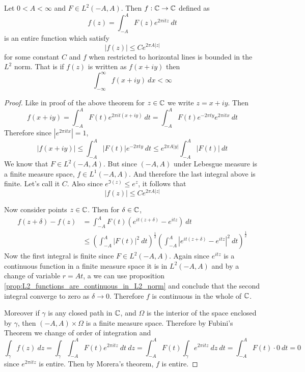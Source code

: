 \begin{proposition}
  Let $0<A<\infty$ and $F \in L^2(-A, A)$. Then $f:\mathbb C \to \mathbb C$ defined as $$f(z) = \int_{-A}^A F(z)e^{2\pi itz} \ dt$$
  is an entire function which satisfy $$|f(z)| \le Ce^{2 \pi A|z|}$$
  for some constant $C$ and $f$ when restricted to horizontal lines is bounded in the $L^2$ norm. That is if $f(z)$ is written as $f(x+iy)$ then  $$\int_{-\infty}^{\infty} f(x+iy) \ dx < \infty$$
\end{proposition}
\begin{proof}
  Like in proof of the above theorem for $z\in \mathbb C$ we write $z = x+iy$. Then $$f(x+iy) = \int_{-A}^A F(t) e^{2\pi it(x+iy)} \ dt = \int_{-A}^A F(t)e^{-2\pi ty}e^{2\pi itx} \ dt$$
  Therefore since $|e^{2\pi it x}| = 1$, $$\left|f(x+iy)\right| \le \int_{-A}^A \left|F(t)\right| e^{-2\pi ty} \ dt \le e^{2\pi A|y|} \int_{-A}^A \left|F(t)\right| \ dt $$
  We know that $F \in L^2(-A, A)$. But since $(-A, A)$ under Lebesgue measure is a finite measure space, $f \in L^1(-A, A)$. And therefore the last integral above is finite. Let's call it $C$. Also since $e^{\Im(z)} \le e^z$, it follows that $$\left|f(z) \right| \le Ce^{2\pi A |z|}$$

  Now consider points $z \in \mathbb C$. Then for $\delta \in \mathbb C$,
  \begin{align*}
    f(z+\delta) - f(z) &= \int_{-A}^A F(t)\left(e^{it(z+\delta)} - e^{itz}\right) \ dt \\
    &\le \left(\int_{-A}^A \left|F(t)\right|^2\ dt \right)^{\frac{1}{2}} \left(\int_{-A}^A \left|e^{it(z+\delta)}-e^{itz}\right|^2 \ dt \right)^{\frac{1}{2}}
  \end{align*}
  Now the first integral is finite since $F\in L^2(-A, A)$. Again since $e^{itz}$ is a continuous function in a finite measure space it is in $L^2(-A, A)$ and by a change of variable $r = At$, a we can use proposition \ref{prop:L2_functions_are_continuous_in_L2_norm} and conclude that the second integral converge to zero as $\delta \to 0$. Therefore $f$ is continuous in the whole of $\mathbb C$. 

  Moreover if $\gamma$ is any closed path in $\mathbb C$, and $\Omega$ is the interior of the space enclosed by $\gamma$, then $(-A, A)\times\Omega$ is a finite measure space. Therefore by Fubini's Theorem we change of order of integration and $$\int_\gamma f(z) \ dz = \int_\gamma \int_{-A}^A F(t)e^{2\pi itz} \ dt \ dz = \int_{-A}^A F(t) \int_\gamma e^{2\pi itz} \ dz \ dt = \int_{-A}^A F(t)\cdot 0 \ dt = 0$$
  since $e^{2\pi itz}$ is entire. Then by Morera's theorem, $f$ is entire.
\end{proof}

